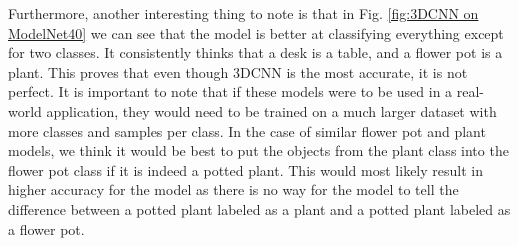 \documentclass[conference]{IEEEtran}
\begin{document}
Furthermore, another interesting thing to note is that in Fig. \ref{fig:3DCNN on ModelNet40} we can see that the model is better at classifying everything except for two classes. It consistently thinks that a desk is a table, and a flower pot is a plant. This proves that even though 3DCNN is the most accurate, it is not perfect. It is important to note that if these models were to be used in a real-world application, they would need to be trained on a much larger dataset with more classes and samples per class. In the case of similar flower pot and plant models, we think it would be best to put the objects from the plant class into the flower pot class if it is indeed a potted plant. This would most likely result in higher accuracy for the model as there is no way for the model to tell the difference between a potted plant labeled as a plant and a potted plant labeled as a flower pot.
\end{document}
